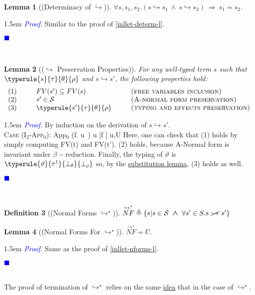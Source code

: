 \documentclass[a4paper,11pt,oneside]{article}
\theoremstyle{plain}
\newtheorem{definition}{Definition}[subsection]
\newtheorem{lemma}[definition]{Lemma}
\renewenvironment{proof}{\noindent \begin{adjustwidth}{1.5em}{} \textcolor{blue}{\textit{Proof.}}}
{{\begin{tiny}\textcolor{blue}{$\blacksquare$}\end{tiny}}
\end{adjustwidth}~\\\noindent}
\newcommand{\tmsbst}[3]{#1 [#2 \mapsfrom #3] }
\newcommand{\bwedge}{\boldsymbol{~\wedge~}}
\newcommand{\brarr}{\boldsymbol{~\Rightarrow~}}
\newcommand{\bth}{\bot_\theta}
\newcommand{\brh}{\bot_\rho}
\newcommand{\inlS}{\mathcal{S}}
\newcommand{\icarr}{\hookrightarrow}
\newcommand{\icarrt}{\icarr^{\star}}
\newcommand{\icNF}{\overset{\icarrt}{NF}}
\newcommand{\ic}[2]{#1 \icarr #2}
\begin{document}
\begin{lemma}[(Determinacy of $\icarr$)] 
	$\forall s, s_1, s_2.
		(s \icarr {s_1} \bwedge s \icarr {s_2}) \brarr
			s_1 = s_2$.	\label{ic-determ-l}	
\end{lemma}
\begin{proof} Similar to the proof of \ref{inllet-determ-l}. 
\end{proof} 
\begin{lemma}[($\icarr$ Preservation Properties)]
For any well-typed term $s$ such that\\ $\typerule{s}{\tau}{\theta}{\rho}$ and $\ic{s}{s'}$, the following properties hold:
\begin{displaymath}
\begin{array}{l@{\hspace*{1cm}}l@{\hspace*{1cm}}l}
	(1)& FV(s') \subseteq FV(s) & \textsc{(free variables inclusion)} \\
	(2)& s' \in\inlS& \textsc{(A-normal form preservation)}\\ 
	(3)& \typerule{s'}{\tau}{\theta}{\rho} &\textsc{(typing and effects preservation)}
	\end{array}
\end{displaymath}
 \label{ic-prop-l}
\end{lemma}	
\begin{proof}
	By induction on the derivation of $\ic{s}{s'}$.  \\
	
	\textsc{Case (I$_2$-App$_0$)}:
	\icrulehead
		{App$_0$}
		{(\lambda f. u~\vartheta)}
		{\tmsbst{u}{f}{\vartheta}}
		{u,\vartheta \in U} 
	\vspace*{0.3cm}
	Here, one can check that (1) holds by simply computing  FV(t) and FV(t').
	(2) holds, because A-Normal form is invariant under $\beta-$reduction.
	Finally, the typing of $\vartheta$ is $\typerule{\vartheta}{\tau^1}{\bth}{\brh}$ so, by the \hyperlink{subst-lemma}{substitution lemma}, (3) holds as well. 
 \end{proof}
 
 \begin{definition}[(Normal Forms $\icarrt$)]
 $ \icNF \triangleq \{ s | s \in\inlS\bwedge 
 \forall s' \in S. s~\cancel{\icarr}~s' \} $
\end{definition}

\begin{lemma}[(Normal Forms For $\icarrt$)] 
$ \icNF  = U.$
\label{ic-nforms-l}
\end{lemma}
\begin{proof} Same as the proof of \cref{inllet-nforms-l}.
\end{proof}
The proof of termination of $\icarrt$ relies on the same \hyperlink{measure-idea}{idea} that in the case of  $\icarrt$.
\end{document}
